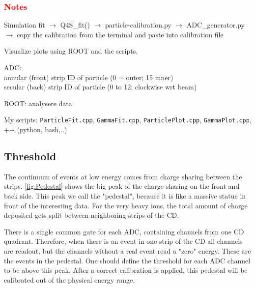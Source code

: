 \documentclass[twoside,english]{uiofysmaster/uiofysmaster}
\begin{document}
\subsubsection*{\textcolor{red}{Notes}}


Simulation fit $\rightarrow$ Q4S\_fit() $\rightarrow$ particle-calibration.py $\rightarrow$  ADC\_generator.py $\rightarrow$ copy the calibration from the terminal and paste into calibration file 

Visualize plots using ROOT and the scripts. 

\bigskip


ADC: \\
annular (front) strip ID of particle (0 = outer; 15 inner) \\
secular (back) strip ID of particle (0 to 12; clockwise wrt beam) \\



\bigskip

ROOT: analysere data \cite{ROOT}


\bigskip


My scripts: \texttt{ParticleFit.cpp},  \texttt{GammaFit.cpp}, \texttt{ParticlePlot.cpp}, \texttt{GammaPlot.cpp}, ++ (python, bash,..)




\subsection{Threshold}
The continuum of events at low energy comes from charge sharing between the strips.
 \autoref{fig:Pedestal} shows the big peak of the charge sharing on the front and back side. 
 This peak we call the "pedestal", because it is like a massive statue in front of the interesting data. 
 For the very heavy ions, the total amount of charge deposited gets split between neighboring strips of the CD. 

There is a single common gate for each ADC, containing channels from one CD quadrant. 
Therefore, when there is an event in one strip of the CD all channels are readout, but the channels without a real event read a "zero" energy.
These are the events in the pedestal.
One should define the threshold for each ADC channel to be above this peak.
After a correct calibration is applied, this pedestal will be calibrated out of the physical energy range.
\end{document}
